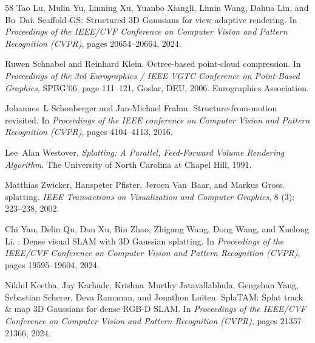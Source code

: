 \documentclass{article}
\begin{document}
\begin{thebibliography}{58}
Tao Lu, Mulin Yu, Linning Xu, Yuanbo Xiangli, Limin Wang, Dahua Lin, and
  Bo~Dai.
\newblock Scaffold-{GS}: Structured 3{D} {G}aussians for view-adaptive
  rendering.
\newblock In \emph{Proceedings of the IEEE/CVF Conference on Computer Vision
  and Pattern Recognition (CVPR)}, pages 20654--20664, 2024.

Ruwen Schnabel and Reinhard Klein.
\newblock Octree-based point-cloud compression.
\newblock In \emph{Proceedings of the 3rd Eurographics / IEEE VGTC Conference
  on Point-Based Graphics}, SPBG'06, page 111–121, Goslar, DEU, 2006.
  Eurographics Association.

Johannes~L Schonberger and Jan-Michael Frahm.
\newblock Structure-from-motion revisited.
\newblock In \emph{Proceedings of the IEEE conference on Computer Vision and
  Pattern Recognition (CVPR)}, pages 4104--4113, 2016.

Lee~Alan Westover.
\newblock \emph{Splatting: A Parallel, Feed-Forward Volume Rendering
  Algorithm}.
\newblock The University of North Carolina at Chapel Hill, 1991.

Matthias Zwicker, Hanspeter Pfister, Jeroen Van~Baar, and Markus Gross.
 splatting.
\newblock \emph{IEEE Transactions on Visualization and Computer Graphics},
  8 (3): 223--238, 2002.

Chi Yan, Delin Qu, Dan Xu, Bin Zhao, Zhigang Wang, Dong Wang, and Xuelong Li.
: Dense visual {SLAM} with 3{D} {G}aussian splatting.
\newblock In \emph{Proceedings of the IEEE/CVF Conference on Computer Vision
  and Pattern Recognition (CVPR)}, pages 19595--19604, 2024.

Nikhil Keetha, Jay Karhade, Krishna~Murthy Jatavallabhula, Gengshan Yang,
  Sebastian Scherer, Deva Ramanan, and Jonathon Luiten.
\newblock Spla{TAM}: Splat track \& map 3{D} {G}aussians for dense {RGB-D
  SLAM}.
\newblock In \emph{Proceedings of the IEEE/CVF Conference on Computer Vision
  and Pattern Recognition (CVPR)}, pages 21357--21366, 2024.


\end{thebibliography}
\end{document}
